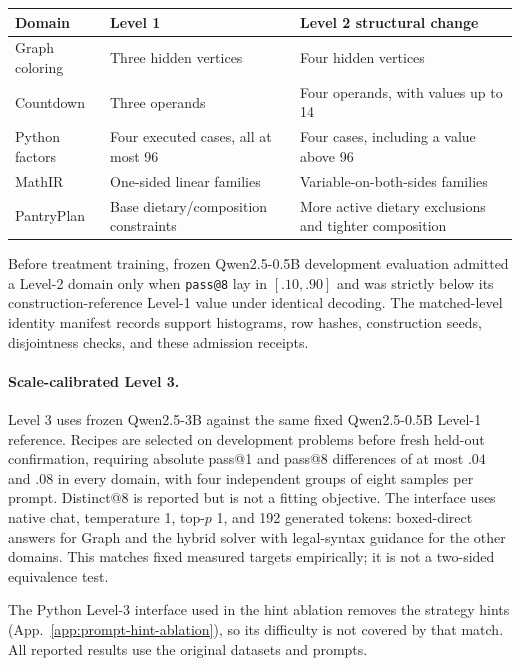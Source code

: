 \documentclass{article}
\newcommand{\1}{\mathbf 1}
\theoremstyle{remark}
\theoremstyle{definition}
\theoremstyle{plain}
\begin{document}
\begin{center}
\small
\begin{tabularx}{.96\linewidth}{@{}lYY@{}}
\toprule
\textbf{Domain} & \textbf{Level 1} & \textbf{Level 2 structural change} \\
\midrule
Graph coloring & Three hidden vertices & Four hidden vertices \\
Countdown & Three operands & Four operands, with values up to 14 \\
Python factors & Four executed cases, all at most 96 & Four cases, including a value above 96 \\
MathIR & One-sided linear families & Variable-on-both-sides families \\
PantryPlan & Base dietary/composition constraints & More active dietary exclusions and tighter composition \\
\bottomrule
\end{tabularx}
\end{center}

Before treatment training, frozen Qwen2.5-0.5B development evaluation admitted
a Level-2 domain only when \texttt{pass@8} lay in $[.10,.90]$ and was strictly below
its construction-reference Level-1 value under identical decoding. The matched-level
identity manifest records support histograms, row hashes, construction
seeds, disjointness checks, and these admission receipts.


\paragraph{Scale-calibrated Level 3.}
Level 3 uses frozen Qwen2.5-3B against the same fixed Qwen2.5-0.5B Level-1
reference. Recipes are selected on development problems before fresh held-out
confirmation, requiring absolute pass@1 and pass@8 differences of at most
$.04$ and $.08$ in every domain, with four independent groups of eight samples
per prompt. Distinct@8 is reported but is not a fitting objective. The
interface uses native chat, temperature 1, top-$p$ 1, and 192 generated
tokens: boxed-direct answers for Graph and the hybrid solver with
legal-syntax guidance for the other domains. This matches fixed measured
targets empirically; it is not a two-sided equivalence test.

The Python Level-3 interface used in the hint ablation removes the strategy
hints (App.~\ref{app:prompt-hint-ablation}), so its difficulty is not
covered by that match. All reported results use the original datasets and
prompts.
\end{document}
